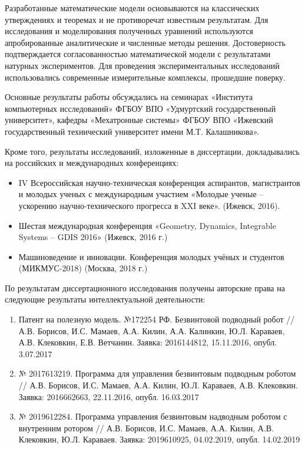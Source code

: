 {\reliability} Разработанные математические модели основываются на классических утверждениях и теоремах и не противоречат известным результатам. Для исследования и моделирования полученных уравнений используются апробированные аналитические и численные методы решения. Достоверность подтверждается согласованностью математической модели с результатами натурных экспериментов. Для проведения экспериментальных исследований использовались современные измерительные комплексы, прошедшие поверку.


{\probation}
Основные результаты работы обсуждались на семинарах «Института компьютерных исследований» ФГБОУ ВПО «Удмуртский государственный университет», кафедры «Мехатронные системы» ФГБОУ ВПО «Ижевский государственный технический университет имени М.Т. Калашникова».

Кроме того, результаты исследований, изложенные в диссертации, докладывались на российских и международных конференциях:
\begin{itemize}
	\item IV Всероссийская научно-техническая конференция аспирантов, магистрантов и молодых ученых с международным участием «Молодые ученые -- ускорению научно-технического прогресса в XXI веке». (Ижевск, 2016).
	\item Шестая международная конференция «Geometry, Dynamics, Integrable Systems -- GDIS 2016» (Ижевск, 2016 г.)
	\item Машиноведение и инновации. Конференция молодых учёных и студентов (МИКМУС-2018) (Москва, 2018 г.)
	
\end{itemize}

По результатам диссертационного исследования получены авторские права на следующие результаты интеллектуальной деятельности:
\begin{enumerate}
	
	\item Патент на полезную модель. №172254 РФ. Безвинтовой подводный робот //  А.В. Борисов, И.С. Мамаев, А.А. Килин, А.А. Калинкин, Ю.Л. Караваев, А.В. Клековкин, Е.В. Ветчанин. Заявка: 2016144812, 15.11.2016, опубл. 3.07.2017
	
	\item № 2017613219. Программа для управления безвинтовым подводным роботом // А.В. Борисов, И.С. Мамаев, А.А. Килин, Ю.Л. Караваев, А.В. Клековкин. Заявка: 2016662663, 22.11.2016, опубл. 16.03.2017
	
	\item № 2019612284. Программа управления безвинтовым надводным роботом с внутренним ротором // А.В. Борисов, И.С. Мамаев, А.А. Килин, А.В. Клековкин, Ю.Л. Караваев. Заявка: 2019610925, 04.02.2019, опубл. 14.02.2019
	
\end{enumerate}

